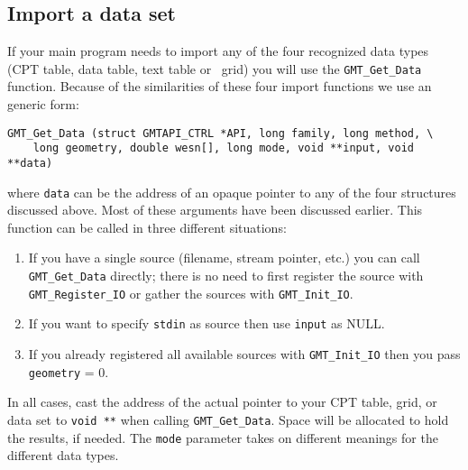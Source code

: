 \documentclass{report}
\begin{document}
\subsection{Import a data set}

If your main program needs to import any of the four recognized data types (CPT table, data table, text table or \GMT\ grid)
you will use the \texttt{GMT\_Get\_Data} function.
Because of the similarities of these four import functions we use
an generic form:

\begin{verbatim}
GMT_Get_Data (struct GMTAPI_CTRL *API, long family, long method, \
    long geometry, double wesn[], long mode, void **input, void **data)
\end{verbatim}
where \texttt{data} can be the address of an opaque pointer to any of the four structures
discussed above.  Most of these arguments have been discussed earlier.  This function can
be called in three different situations:
\begin{enumerate}
\item If you have a single source (filename, stream pointer, etc.) you can call
\texttt{GMT\_Get\_Data} directly; there is no need to first register the source
with \texttt{GMT\_Register\_IO} or gather the sources with \texttt{GMT\_Init\_IO}.
\item If you want to specify \texttt{stdin} as source then use \texttt{input} as NULL.
\item If you already registered all available sources with \texttt{GMT\_Init\_IO} then
you pass \texttt{geometry} = 0.
\end{enumerate}
In all cases, cast the address of the actual pointer to your CPT table, grid, or data set to
\texttt{void **} when calling \texttt{GMT\_Get\_Data}.  Space will
be allocated to hold the results, if needed.
The \texttt{mode} parameter takes on different meanings for the different data types.
\end{document}
